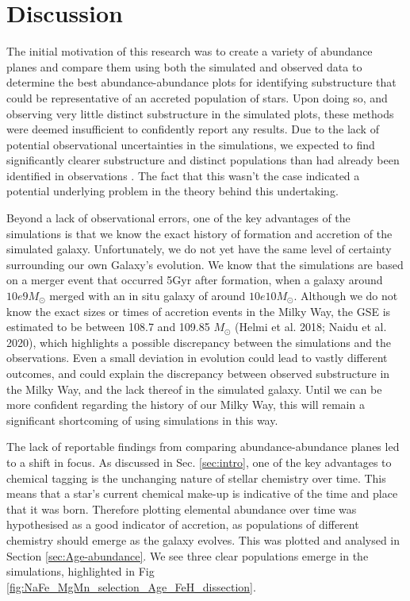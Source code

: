 \documentclass[fleqn,usenatbib]{mnras}
\begin{document}
\section{Discussion} \label{sec:discussion}
The initial motivation of this research was to create a variety of abundance planes and compare them using both the simulated and observed data to determine the best abundance-abundance plots for identifying substructure that could be representative of an accreted population of stars. Upon doing so, and observing very little distinct substructure in the simulated plots, these methods were deemed insufficient to confidently report any results. Due to the lack of potential observational uncertainties in the simulations, we expected to find significantly clearer substructure and distinct populations than had already been identified in observations \citep{Buder2022}. The fact that this wasn’t the case indicated a potential underlying problem in the theory behind this undertaking.  \par 
Beyond a lack of observational errors, one of the key advantages of the simulations is that we know the exact history of formation and accretion  of the simulated galaxy. Unfortunately, we do not yet have the same level of certainty surrounding our own Galaxy’s evolution. We know that the simulations are based on a merger event that occurred 5Gyr after formation, when a galaxy around $10e9 M_{\odot}$ merged with an in situ galaxy of around $10e10 M_{\odot}$. %
Although we do not know the exact sizes or times of accretion events in the Milky Way, the GSE is estimated to be between 108.7 and 109.85 $M_{\odot}$ (Helmi et al. 2018; Naidu et al. 2020), which highlights a possible discrepancy between the simulations and the observations. Even a small deviation in evolution could lead to vastly different outcomes, and could explain the discrepancy between observed substructure in the Milky Way, and the lack thereof in the simulated galaxy. Until we can be more confident regarding the history of our Milky Way, this will remain a significant shortcoming of using simulations in this way. \par 
The lack of reportable findings from comparing abundance-abundance planes led to a shift in focus. As discussed in Sec. \ref{sec:intro}, one of the key advantages to chemical tagging is the unchanging nature of stellar chemistry over time. This means that a star’s current chemical make-up is indicative of the time and place that it was born. Therefore plotting elemental abundance over time was hypothesised as a good indicator of accretion, as populations of different chemistry should emerge as the galaxy evolves. This was plotted and analysed in Section \ref{sec:Age-abundance}. We see three clear populations emerge in the simulations, highlighted in Fig \ref{fig:NaFe_MgMn_selection_Age_FeH_dissection}. \par 
\end{document}
